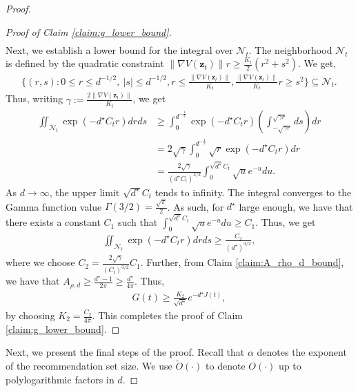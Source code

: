 \documentclass[12pt]{article}
\theoremstyle{definition}
\theoremstyle{remark}
\begin{document}
\begin{proof}
\begin{proof}[Proof of Claim \ref{claim:g_lower_bound}]
\begin{align*}
\end{align*}
Next, we establish a lower bound for the integral over $\mathcal{N}_t$. The neighborhood $\mathcal{N}_t$ is defined by the quadratic constraint $\|\nabla V(\mathbf{z}_t)\| r \geq \frac{K_t}{2}(r^2 + s^2)$. We get,
\begin{align*}
    \Big\{ (r,s) : 0\leq r \leq d^{-1/2}, \ |s| \leq d^{-1/2}, r \leq \frac{\|\nabla V(\mathbf{z}_t)\|}{K_t},  \frac{\|\nabla V(\mathbf{z}_t)\|}{K_t} r \geq s^2 \Big\} \subseteq \mathcal{N}_t.
\end{align*}
Thus, writing $\gamma := \frac{2\|\nabla V(\mathbf{z}_t)\|}{K_t}$, we get
\begin{align*}
    \iint_{\mathcal{N}_t} \exp(-d^\star C_t r) dr ds &\geq \int_{0}^{d^{-\frac12}} \exp(-d^\star C_t r) \left( \int_{-\sqrt{\gamma r}}^{\sqrt{\gamma r}} ds \right) dr \\
    & = 2\sqrt{\gamma} \int_{0}^{d^{-\frac12}} \sqrt{r} \exp(-d^\star C_t r)dr\\
    &= \frac{2\sqrt{\gamma}}{(d^\star C_t)^{3/2}} \int_{0}^{\sqrt{d^\star} C_t} \sqrt{u} e^{-u} du.
\end{align*}
As $d \to \infty$, the upper limit $\sqrt{d^\star} C_t$ tends to infinity. The integral converges to the Gamma function value $\Gamma(3/2) = \frac{\sqrt{\pi}}{2}$. As such, for $d^\star$ large enough, we have that there exists a constant $C_1$ such that $\int_{0}^{\sqrt{d^\star} C_t} \sqrt{u} e^{-u} du \geq C_1$. Thus, we get
\begin{align*}
    \iint_{\mathcal{N}_t} \exp(-d^\star C_t r) dr ds \geq \frac{C_2}{(d^\star)^{3/2}},
\end{align*}
where we choose $C_2 = \frac{2\sqrt{\gamma}}{(C_t)^{3/2}} C_1 $. Further, from Claim \ref{claim:A_rho_d_bound}, we have that $A_{\rho,d} \geq \frac{d^\star - 1}{2\pi} \geq \frac{d^\star}{4\pi}$. Thus,
\begin{align*}
    G(t) \geq \frac{K_2}{\sqrt{d^\star}} e^{- d^\star J(t)},
\end{align*}
by choosing $K_2 = \frac{C_2}{4\pi}$. This completes the proof of Claim \ref{claim:g_lower_bound}.
\end{proof}

Next, we present the final steps of the proof. Recall that $\alpha$ denotes the exponent of the recommendation set size. We use $\tilde O(\cdot)$ to denote $O(\cdot)$ up to polylogarithmic factors in $d$.


\end{proof}
\end{document}
